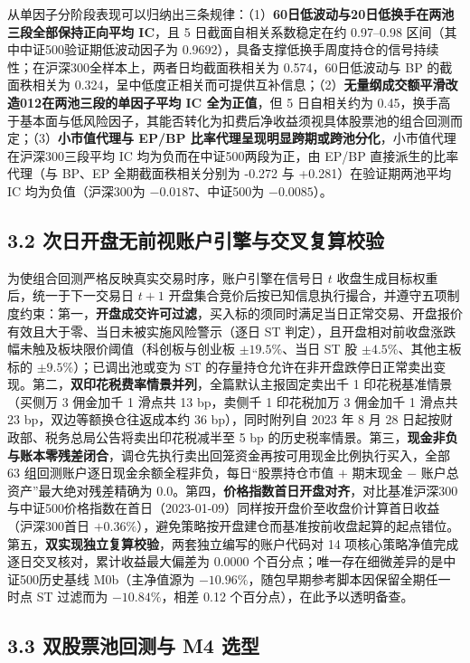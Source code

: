 \documentclass[12pt,a4paper]{article}
\let\origsubsection\subsection
\renewcommand{\subsection}[1]{\needspace{4\baselineskip}\origsubsection{#1}}
\begin{document}
从单因子分阶段表现可以归纳出三条规律：（1）\textbf{60日低波动与20日低换手在两池三段全部保持正向平均 IC}，且 5 日截面自相关系数稳定在约 0.97--0.98 区间（其中中证500验证期低波动因子为 0.9692），具备支撑低换手周度持仓的信号持续性；在沪深300全样本上，两者日均截面秩相关为 0.574，60日低波动与 BP 的截面秩相关为 0.324，呈中低度正相关而可提供互补信息；（2）\textbf{无量纲成交额平滑改造012在两池三段的单因子平均 IC 全为正值}，但 5 日自相关约为 0.45，换手高于基本面与低风险因子，其能否转化为扣费后净收益须视具体股票池的组合回测而定；（3）\textbf{小市值代理与 EP/BP 比率代理呈现明显跨期或跨池分化}，小市值代理在沪深300三段平均 IC 均为负而在中证500两段为正，由 EP/BP 直接派生的比率代理（与 BP、EP 全期截面秩相关分别为 -0.272 与 +0.281）在验证期两池平均 IC 均为负值（沪深300为 $-0.0187$、中证500为 $-0.0085$）。

\subsection{3.2 次日开盘无前视账户引擎与交叉复算校验}

为使组合回测严格反映真实交易时序，账户引擎在信号日 $t$ 收盘生成目标权重后，统一于下一交易日 $t+1$ 开盘集合竞价后按已知信息执行撮合，并遵守五项制度约束：第一，\textbf{开盘成交许可过滤}，买入标的须同时满足当日正常交易、开盘报价有效且大于零、当日未被实施风险警示（逐日 ST 判定），且开盘相对前收盘涨跌幅未触及板块限价阈值（科创板与创业板 $\pm 19.5\%$、当日 ST 股 $\pm 4.5\%$、其他主板标的 $\pm 9.5\%$）；已调出池或变为 ST 的存量持仓允许在非开盘跌停日正常卖出变现。第二，\textbf{双印花税费率情景并列}，全篇默认主报固定卖出千 1 印花税基准情景（买侧万 3 佣金加千 1 滑点共 13 bp，卖侧千 1 印花税加万 3 佣金加千 1 滑点共 23 bp，双边等额换仓往返成本约 36 bp），同时附列自 2023 年 8 月 28 日起按财政部、税务总局公告将卖出印花税减半至 5 bp 的历史税率情景。第三，\textbf{现金非负与账本零残差闭合}，调仓先执行卖出回笼资金再按可用现金比例执行买入，全部 63 组回测账户逐日现金余额全程非负，每日“股票持仓市值 $+$ 期末现金 $-$ 账户总资产”最大绝对残差精确为 0.0。第四，\textbf{价格指数首日开盘对齐}，对比基准沪深300与中证500价格指数在首日（2023-01-09）同样按开盘价至收盘价计算首日收益（沪深300首日 $+0.36\%$），避免策略按开盘建仓而基准按前收盘起算的起点错位。第五，\textbf{双实现独立复算校验}，两套独立编写的账户代码对 14 项核心策略净值完成逐日交叉核对，累计收益最大偏差为 0.0000 个百分点；唯一存在细微差异的是中证500历史基线 M0b（主净值源为 $-10.96\%$，随包早期参考脚本因保留全期任一时点 ST 过滤而为 $-10.84\%$，相差 0.12 个百分点），在此予以透明备查。

\subsection{3.3 双股票池回测与 M4 选型}
\end{document}
